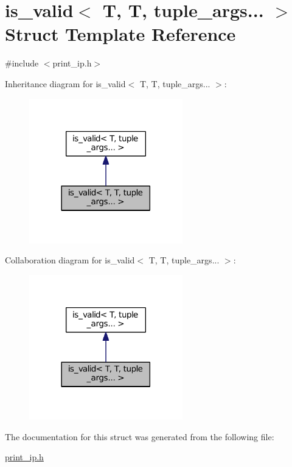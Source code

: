 \hypertarget{structis__valid_3_01T_00_01T_00_01tuple__args_8_8_8_01_4}{}\section{is\+\_\+valid$<$ T, T, tuple\+\_\+args... $>$ Struct Template Reference}
\label{structis__valid_3_01T_00_01T_00_01tuple__args_8_8_8_01_4}


{\ttfamily \#include $<$print\+\_\+ip.\+h$>$}



Inheritance diagram for is\+\_\+valid$<$ T, T, tuple\+\_\+args... $>$\+:
\nopagebreak
\begin{figure}[H]
\begin{center}
\leavevmode
\includegraphics[width=189pt]{structis__valid_3_01T_00_01T_00_01tuple__args_8_8_8_01_4__inherit__graph}
\end{center}
\end{figure}


Collaboration diagram for is\+\_\+valid$<$ T, T, tuple\+\_\+args... $>$\+:
\nopagebreak
\begin{figure}[H]
\begin{center}
\leavevmode
\includegraphics[width=189pt]{structis__valid_3_01T_00_01T_00_01tuple__args_8_8_8_01_4__coll__graph}
\end{center}
\end{figure}


The documentation for this struct was generated from the following file\+:\begin{DoxyCompactItemize}
\item 
\hyperlink{print__ip_8h}{print\+\_\+ip.\+h}\end{DoxyCompactItemize}
